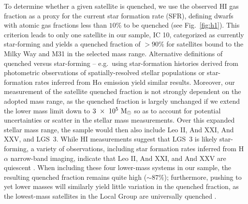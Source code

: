 \documentclass[usenatbib]{mn2e}
\newcommand{\msun}{{\rm M}_{\odot}}
\begin{document}
To determine whether a given satellite is quenched, we use the
observed H{\scriptsize I} gas fraction as a proxy for the current star
formation rate (SFR), defining dwarfs with atomic gas fractions less
than $10\%$ to be quenched (see Fig.~\ref{fig:h1}). This criterion
leads to only one satellite in our sample, IC 10, categorized as
currently star-forming and yields a quenched fraction of $>90\%$ for
satellites bound to the Milky Way and M31 in the selected mass
range. 
%
Alternative definitions of quenched versus star-forming -- e.g.~using
star-formation histories derived from photometric observations of
spatially-resolved stellar populations \citep{weisz14a, weisz15} or
star-formation rates inferred from H$\alpha$ emission \citep{kaisin13,
  karachentsev13} yield similar results.
%
Moreover, our measurement of the satellite quenched fraction is not
strongly dependent on the adopted mass range, as the quenched fraction
is largely unchanged if we extend the lower mass limit down to
$3~\times~10^{5}~\msun$ so as to account for potential uncertainties
or scatter in the stellar mass measurements.
%
Over this expanded stellar mass range, the sample would then also
include Leo II, And XXI, And XXV, and LGS~3. While H{\scriptsize I}
measurements suggest that LGS~3 is likely star-forming, a variety of
observations, including star formation rates inferred from H$\alpha$
narrow-band imaging, indicate that Leo II, And XXI, and And XXV are
quiescent \citep{grcevich09, kaisin12, kaisin13, spekkens14, weisz14a,
  weisz14b}. When including these four lower-mass systems in our
sample, the resulting quenched fraction remains quite
high %
($\sim87\%$); furthermore, pushing to yet lower masses will similarly
yield little variation in the quenched fraction, as the lowest-mass
satellites in the Local Group are universally quenched
\citep[e.g.][]{okamoto08, sand09, sand10, weisz14a, brown14}.
\end{document}
